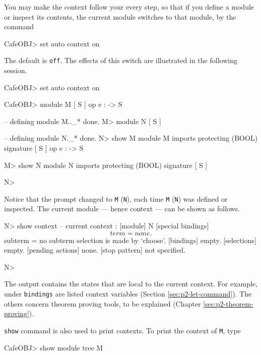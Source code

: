 \documentclass[a4paper]{memoir}
\begin{document}
You may make the context follow your every step, so that if you
define a module or inspect its contents, the current module switches
to that module, by the command
\begin{vvtm}
\begin{ccode}
  CafeOBJ> set auto context on
\end{ccode}
\end{vvtm}
The default is \verb|off|.
The effects of this switch are illustrated in the following session.
\begin{vvtm}
\begin{ccode}
  CafeOBJ> set auto context on

  CafeOBJ> module M { [ S ] op e : -> S }

  -- defining module M.._* done.
  M> module N { [ S ] }

  -- defining module N._* done.
  N> show M
  module M {
    imports {
      protecting (BOOL)
    }
    signature {
      [ S ]
      op e : -> S
    }
  }

  M> show N
  module N {
    imports {
      protecting (BOOL)
    }
    signature {
      [ S ]
    }
  }

  N> 
\end{ccode}
\end{vvtm}
Notice that the prompt changed to \verb|M| (\verb|N|), each time
\verb|M| (\verb|N|) was defined or inspected. The current module ---
hence context --- can be shown as follows.
\begin{vvtm}
\begin{ccode}
  N> show context
  -- current context :
  [module] N
  [special bindings]
    $$term    = none.
    $$subterm = no subterm selection is made by `choose'.
  [bindings] empty.
  [selections]  empty.
  [pending actions]  none.
  [stop pattern] not specified.

  N>
\end{ccode}
\end{vvtm}
The output contains the states that are local to the current context.
For example, under \verb|bindings| are listed context variables
(Section \ref{sec:p2-let-command}). The others concern theorem
proving tools, to be explained (Chapter \ref{sec:p2-theorem-proving}).

\verb|show| command is also used to print contexts. To print the context
of \verb|M|, type
\begin{vvtm}
\begin{ccode}
  CafeOBJ> show module tree M
\end{ccode}
\end{vvtm}
\end{document}
